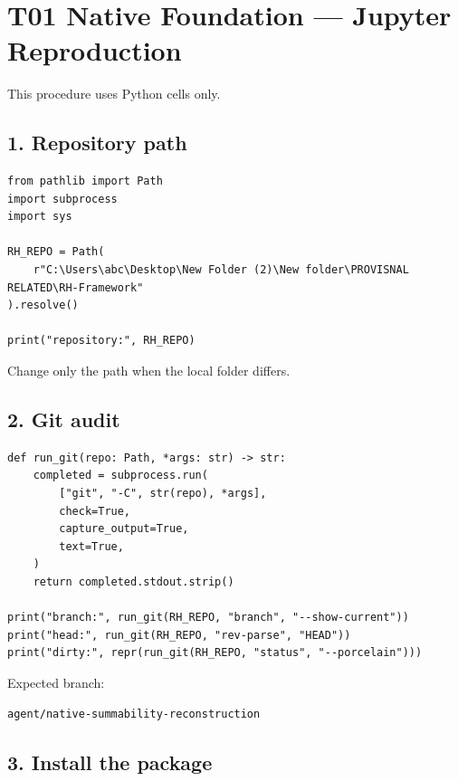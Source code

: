 \hypertarget{t01-native-foundation-jupyter-reproduction}{%
\chapter{T01 Native Foundation --- Jupyter Reproduction}\label{t01-native-foundation-jupyter-reproduction}}

This procedure uses Python cells only.

\hypertarget{repository-path}{%
\section{1. Repository path}\label{repository-path}}

\begin{verbatim}
from pathlib import Path
import subprocess
import sys

RH_REPO = Path(
    r"C:\Users\abc\Desktop\New Folder (2)\New folder\PROVISNAL RELATED\RH-Framework"
).resolve()

print("repository:", RH_REPO)
\end{verbatim}

Change only the path when the local folder differs.

\hypertarget{git-audit}{%
\section{2. Git audit}\label{git-audit}}

\begin{verbatim}
def run_git(repo: Path, *args: str) -> str:
    completed = subprocess.run(
        ["git", "-C", str(repo), *args],
        check=True,
        capture_output=True,
        text=True,
    )
    return completed.stdout.strip()

print("branch:", run_git(RH_REPO, "branch", "--show-current"))
print("head:", run_git(RH_REPO, "rev-parse", "HEAD"))
print("dirty:", repr(run_git(RH_REPO, "status", "--porcelain")))
\end{verbatim}

Expected branch:

\begin{verbatim}
agent/native-summability-reconstruction
\end{verbatim}

\hypertarget{install-the-package}{%
\section{3. Install the package}\label{install-the-package}}

